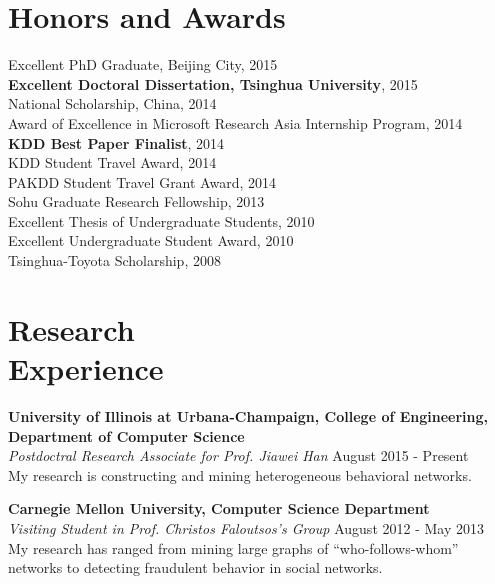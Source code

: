 \documentclass[margin, 10pt]{res} %
\begin{document}
\begin{resume}

\section{Honors and Awards}

{Excellent PhD Graduate, Beijing City}, 2015 \\
{\bf Excellent Doctoral Dissertation, Tsinghua University}, 2015 \\
{National Scholarship, China}, 2014 \\
{Award of Excellence in Microsoft Research Asia Internship Program}, 2014 \\
{\bf KDD Best Paper Finalist}, 2014 \\
{KDD Student Travel Award}, 2014 \\
{PAKDD Student Travel Grant Award}, 2014 \\
{Sohu Graduate Research Fellowship}, 2013 \\
{Excellent Thesis of Undergraduate Students}, 2010 \\
{Excellent Undergraduate Student Award}, 2010 \\
{Tsinghua-Toyota Scholarship}, 2008


\section{Research \\ Experience}

{\bf University of Illinois at Urbana-Champaign, College of Engineering, Department of Computer Science} \\
{\em Postdoctral Research Associate for Prof. Jiawei Han} \hfill {August 2015 - Present} \\
My research is constructing and mining heterogeneous behavioral networks.

{\bf Carnegie Mellon University, Computer Science Department} \\
{\em Visiting Student in Prof. Christos Faloutsos's Group} \hfill {August 2012 - May 2013} \\
My research has ranged from mining large graphs of ``who-follows-whom'' networks to detecting fraudulent behavior in social networks.


\end{resume}
\end{document}
